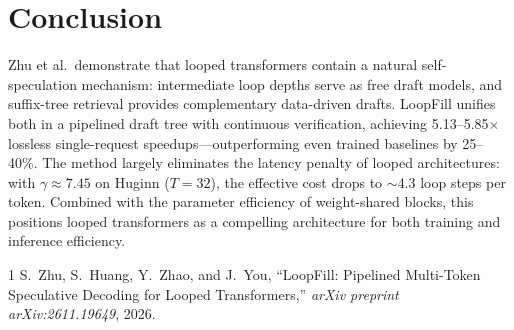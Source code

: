 \documentclass[11pt,a4paper]{article}
\begin{document}
\section{Conclusion}
Zhu et al.\ demonstrate that looped transformers contain a natural self-speculation mechanism: intermediate loop depths serve as free draft models, and suffix-tree retrieval provides complementary data-driven drafts. LoopFill unifies both in a pipelined draft tree with continuous verification, achieving 5.13--5.85$\times$ lossless single-request speedups---outperforming even trained baselines by 25--40\%. The method largely eliminates the latency penalty of looped architectures: with $\gamma \approx 7.45$ on Huginn ($T{=}32$), the effective cost drops to $\sim$4.3 loop steps per token. Combined with the parameter efficiency of weight-shared blocks, this positions looped transformers as a compelling architecture for both training and inference efficiency.

\begin{thebibliography}{1}
S.~Zhu, S.~Huang, Y.~Zhao, and J.~You,
``LoopFill: Pipelined Multi-Token Speculative Decoding for Looped Transformers,''
\textit{arXiv preprint arXiv:2611.19649}, 2026.
\end{thebibliography}
\end{document}
